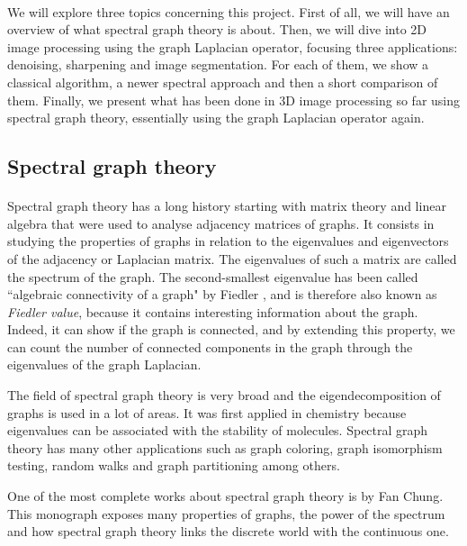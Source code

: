 \paragraph{}
We will explore three topics concerning this project.
First of all, we will have an overview of what spectral graph theory is about.
Then, we will dive into 2D image processing using the graph Laplacian operator, focusing three applications: denoising, sharpening and image segmentation.
For each of them, we show a classical algorithm, a newer spectral approach and then a short comparison of them.
Finally, we present what has been done in 3D image processing so far using spectral graph theory, essentially using the graph Laplacian operator again.

\subsection{Spectral graph theory}

\paragraph{}
Spectral graph theory has a long history starting with matrix theory and linear algebra that were used to analyse adjacency matrices of graphs.
It consists in studying the properties of graphs in relation to the eigenvalues and eigenvectors of the adjacency or Laplacian matrix.
The eigenvalues of such a matrix are called the spectrum of the graph.
The second-smallest eigenvalue has been called ``algebraic connectivity of a graph" by Fiedler \cite{fiedler_algebraic_1973}, and is therefore also known as \textit{Fiedler value}, because it contains interesting information about the graph.
Indeed, it can show if the graph is connected, and by extending this property, we can count the number of connected components in the graph through the eigenvalues of the graph Laplacian.

The field of spectral graph theory is very broad and the eigendecomposition of graphs is used in a lot of areas.
It was first applied in chemistry because eigenvalues can be associated with the stability of molecules.
Spectral graph theory has many other applications such as graph coloring, graph isomorphism testing, random walks and graph partitioning among others.

One of the most complete works about spectral graph theory is \cite{chung_spectral_1997} by Fan Chung.
This monograph exposes many properties of graphs, the power of the spectrum and how spectral graph theory links the discrete world with the continuous one.

